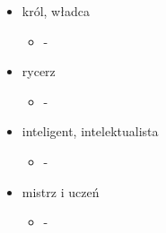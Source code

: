 \documentclass[a4paper]{article}
\begin{document}
\begin{itemize}
\begin{itemize}
        \item -
    \end{itemize}
    \item król, władca \begin{itemize}
        \item -
    \end{itemize}
    \item rycerz \begin{itemize}
        \item -
    \end{itemize}
    \item inteligent, intelektualista \begin{itemize}
        \item -
    \end{itemize}
    \item mistrz i uczeń \begin{itemize}
        \item -
    \end{itemize}
\end{itemize}
\end{document}
